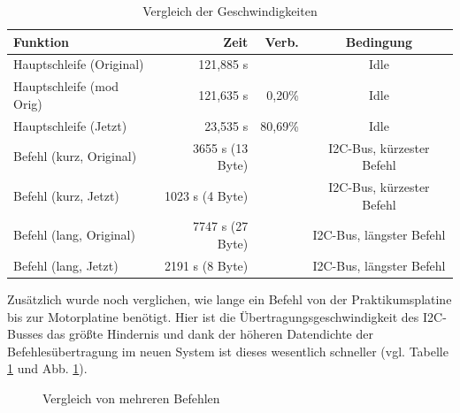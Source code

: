 \begin{table}[htb]
\begin{center}
	\begin{tabular}{|l||r|r|c|}
		\hline
		\textbf{Funktion} & \textbf{Zeit} & \textbf{Verb.} & \textbf{Bedingung} \\ \hline \hline
		Hauptschleife (Original) & 121,885 \textmu{}s & & Idle \\ \hline
		Hauptschleife (mod Orig) & 121,635 \textmu{}s & 0,20\% & Idle \\ \hline
		Hauptschleife (Jetzt) & 23,535 \textmu{}s & 80,69\% & Idle \\ \hline \hline
		Befehl (kurz, Original) & 3655 \textmu{}s (13 Byte) & & I2C-Bus, kürzester Befehl \\ \hline
		Befehl (kurz, Jetzt) & 1023 \textmu{}s (4 Byte) & & I2C-Bus, kürzester Befehl \\ \hline
		Befehl (lang, Original) & 7747 \textmu{}s (27 Byte) & & I2C-Bus, längster Befehl \\ \hline
		Befehl (lang, Jetzt) & 2191 \textmu{}s (8 Byte) & & I2C-Bus, längster Befehl \\ \hline
	\end{tabular}
	\caption{\label{vergl_speed} Vergleich der Geschwindigkeiten}
\end{center}
\end{table}
Zusätzlich wurde noch verglichen, wie lange ein Befehl von der Praktikumsplatine bis zur Motorplatine benötigt.
Hier ist die Übertragungsgeschwindigkeit des I2C-Busses das größte Hindernis und dank der höheren Datendichte
der Befehlesübertragung im neuen System ist dieses wesentlich schneller (vgl. Tabelle \ref{vergl_speed} und Abb.
 \ref{vergl_befehle}).
\begin{figure}[htb]
 \centering
 \caption{\label{vergl_befehle}Vergleich von mehreren Befehlen}
\end{figure}
